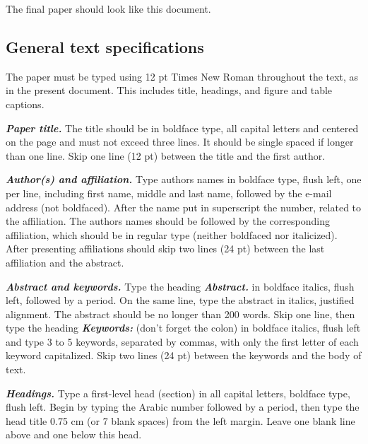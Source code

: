 \documentclass[12pt,fleqn]{article}
\begin{document}
The final paper should look like this document.

\subsection{General text specifications}

The paper must be typed using 12 pt Times New Roman throughout the text, as in
the present document. This includes title, headings, and figure and table
captions.

\vspace{0.5cm} %

\textbf{\textit{Paper title.}} The title should be in boldface type, all
capital letters and centered on the page and must not exceed three lines. It
should be single spaced if longer than one line. Skip one line (12 pt) between
the title and the first author.

\vspace{0.5cm} %

\textbf{\textit{Author(s) and affiliation.}} Type authors names in boldface
type, flush left, one per line, including first name, middle and last name,
followed by the e-mail address (not boldfaced). After the name put in
superscript the number, related to the affiliation. The authors names should be
followed by the corresponding affiliation, which should be in regular type
(neither boldfaced nor italicized). After presenting affiliations should skip
two lines (24 pt) between the last affiliation and the abstract.

\vspace{0.5cm} %

\textbf{\textit{Abstract and keywords.}} Type the heading
\textbf{\textit{Abstract.}} in boldface italics, flush left, followed by a
period. On the same line, type the abstract in italics, justified alignment.
The abstract should be no longer than 200 words. Skip one line, then type the
heading \textbf{\textit{Keywords:}} (don't forget the colon) in boldface
italics, flush left and type 3 to 5 keywords, separated by commas, with only
the first letter of each keyword capitalized. Skip two lines (24 pt) between
the keywords and the body of text.

\vspace{0.5cm} %

\textbf{\textit{Headings.}} Type a first-level head (section) in all capital
letters, boldface type, flush left. Begin by typing the Arabic number followed
by a period, then type the head title 0.75 cm (or 7 blank spaces) from the left
margin. Leave one blank line above and one below this head.
\end{document}
